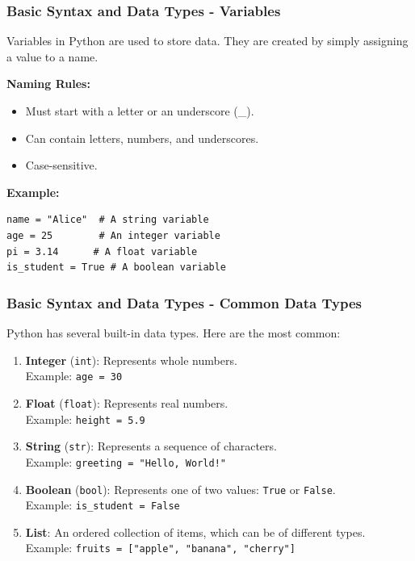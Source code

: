 \documentclass{beamer}
\begin{document}
\begin{frame}[fragile]
    \frametitle{Basic Syntax and Data Types - Variables}
    Variables in Python are used to store data. They are created by simply assigning a value to a name.
    
    \textbf{Naming Rules:}
    \begin{itemize}
        \item Must start with a letter or an underscore (\_).
        \item Can contain letters, numbers, and underscores.
        \item Case-sensitive.
    \end{itemize}

    \textbf{Example:}
    \begin{lstlisting}
name = "Alice"  # A string variable
age = 25        # An integer variable
pi = 3.14      # A float variable
is_student = True # A boolean variable
    \end{lstlisting}
\end{frame}

\begin{frame}[fragile]
    \frametitle{Basic Syntax and Data Types - Common Data Types}
    Python has several built-in data types. Here are the most common:
    \begin{enumerate}
        \item \textbf{Integer} (\texttt{int}): Represents whole numbers. \\
        Example: \texttt{age = 30}
        
        \item \textbf{Float} (\texttt{float}): Represents real numbers. \\
        Example: \texttt{height = 5.9}
        
        \item \textbf{String} (\texttt{str}): Represents a sequence of characters. \\
        Example: \texttt{greeting = "Hello, World!"}
        
        \item \textbf{Boolean} (\texttt{bool}): Represents one of two values: \texttt{True} or \texttt{False}. \\
        Example: \texttt{is_student = False}
        
        \item \textbf{List}: An ordered collection of items, which can be of different types. \\
        Example: \texttt{fruits = ["apple", "banana", "cherry"]}
    \end{enumerate}
\end{frame}
\end{document}
